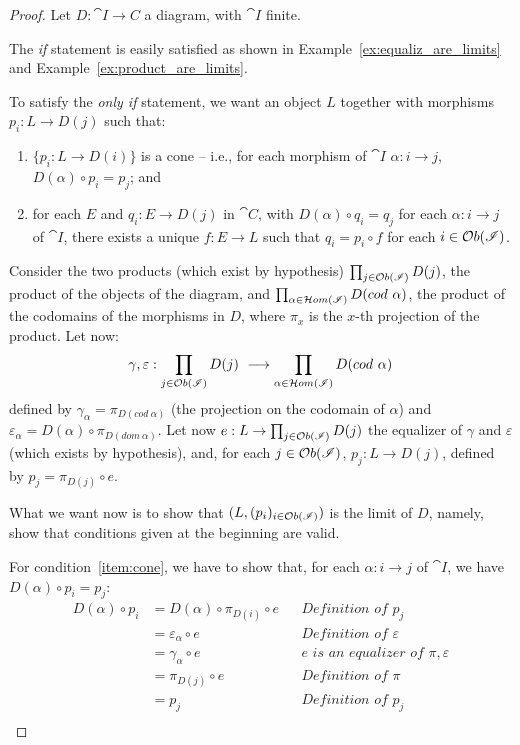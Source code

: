 \documentclass[a4paper, twoside,openright]{report}
\theoremstyle{plain}
\theoremstyle{definition}
\begin{document}
\begin{proof}
    Let $D: \cat{I \rightarrow C}$ a diagram, with $\cat I$ finite.
    
    The \emph{if} statement is easily satisfied as shown in Example~\ref{ex:equaliz_are_limits} and Example~\ref{ex:product_are_limits}.

    To satisfy the \emph{only if} statement, we want an object $L$ together with morphisms $p_i : L \rightarrow D(j)$ such that:
    \begin{enumerate}
        \item\label{item:cone} $\{p_i: L \rightarrow D(i)\}$ is a cone -- i.e., for each morphism of $\cat I$ $\alpha : i \rightarrow j$, $D(\alpha) \circ p_i = p_j$; and
        \item\label{item:univ_prop} for each $E$ and $q_i : E \rightarrow D(j)$ in $\cat C$, with $D(\alpha) \circ q_i = q_j$ for each $\alpha : i \rightarrow j$ of $\cat I$, there exists a unique $f: E \rightarrow L$ such that $q_i = p_i \circ f$ for each $i \in \mathcal{O}b(\mathscr{I})$.
    \end{enumerate}

    Consider the two products (which exist by hypothesis) $\prod_{j \in \mathcal{O}b(\mathscr{I})} D(j)$, the product of the objects of the diagram, and $\prod_{\alpha \in \Hom(\cat I)}D(cod \ \alpha)$, the product of the codomains of the morphisms in $D$, where $\pi_x$ is the $x$-th projection of the product.
    Let now:
    \[
        \gamma, \varepsilon : \prod_{j \in \mathcal{O}b(\mathscr{I})}D(j) \ \longrightarrow \prod_{\alpha \in \mathcal{H}om(\mathscr{I})} D(cod \ \alpha)
    \]
    defined by $\gamma_\alpha = \pi_{D(cod\ \alpha)}$ (the projection on the codomain of $\alpha$) and $\varepsilon_\alpha = D(\alpha) \circ \pi_{D(dom \ \alpha)}$.
    Let now $e: L \rightarrow \prod_{j \in \mathcal{O}b(\mathscr{I})}D(j)$ the equalizer of $\gamma$ and $\varepsilon$ (which exists by hypothesis), and, for each $j \in \mathcal{O}b(\mathscr{I})$, $p_j: L \rightarrow D(j)$, defined by $p_j = \pi_{D(j)} \circ e$.
    
    What we want now is to show that $(L, (p_i)_{i \in \mathcal{O}b(\mathscr{I})})$ is the limit of $D$, namely, show that conditions given at the beginning are valid.

    For condition~\ref{item:cone}, we have to show that, for each $\alpha : i \rightarrow j$ of $\cat I$, we have $D(\alpha) \circ p_i = p_j$:
    \begin{align*}
        D(\alpha) \circ p_i 
            &= D(\alpha) \circ \pi_{D(i)} \circ e   && \textit{Definition of $p_j$} \\
            &= \varepsilon_{\alpha} \circ e         && \textit{Definition of $\varepsilon$}\\
            &= \gamma_\alpha \circ e                && \textit{$e$ is an equalizer of $\pi, \varepsilon$}\\
            &= \pi_{D(j)} \circ e                   && \textit{Definition of $\pi$} \\
            &= p_j                                  && \textit{Definition of $p_j$} \\
    \end{align*}


\end{proof}
\end{document}

